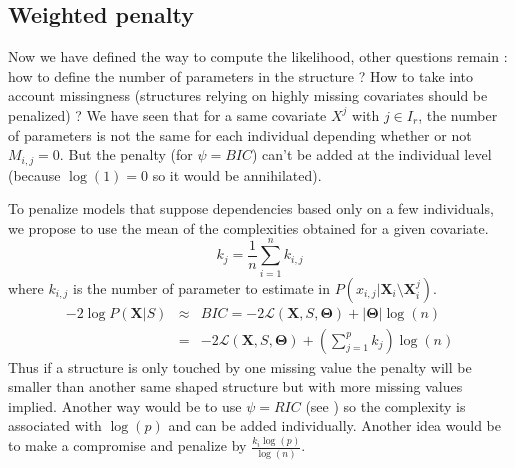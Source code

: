 \documentclass[12pt,a4paper]{report}
\begin{document}
%			
%			
		\subsection{Weighted penalty}
			Now we have defined the way to compute the likelihood, other questions remain : how to define the number of parameters in the structure ?		How to take into account missingness (structures relying on highly missing covariates should be penalized) ?
			We have seen that for a same covariate $X^j$ with $ j \in I_r$, the number of parameters is not the same for each individual depending whether or not $M_{i,j}=0$. But the penalty (for $\psi=BIC$) can't be added at the individual level (because $\log(1)=0$ so it would be annihilated). 
			
			To penalize models that suppose dependencies based only on a few individuals, we propose to use the mean of the complexities obtained for a given covariate.
			\begin{equation}
			k_j=\frac{1}{n}\sum_{i=1}^nk_{i,j}
\end{equation}						where $k_{i,j}$ is the number of parameter to estimate in $P(x_{i,j}|\boldsymbol{X}_i\setminus \boldsymbol{X}_i^j)$.
			\begin{eqnarray}
		-2\log P(\boldsymbol{X}|S)&\approx & BIC=-2\mathcal{L}(\boldsymbol{X},S,\boldsymbol{\Theta})+|\boldsymbol{\Theta}|\log(n) \\
		&=& -2\mathcal{L}(\boldsymbol{X},S,\boldsymbol{\Theta})+(\sum_{j=1}^pk_j)\log(n)
	\end{eqnarray}
			 Thus if a structure is only touched by one missing value the penalty will be smaller than another same shaped structure but with more missing values implied.
			Another way would be to use $\psi=RIC$ (see \cite{foster1994risk}) so the complexity is associated with $\log(p)$ and can be added individually. Another idea would be to make a compromise and penalize by $\frac{k_i\log(p)}{\log(n)}$.
		
\end{document}
